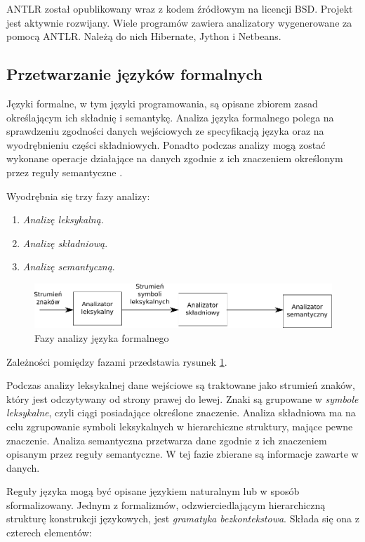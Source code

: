 ANTLR został opublikowany wraz z kodem źródłowym na licencji BSD. Projekt jest
aktywnie rozwijany. Wiele programów zawiera analizatory wygenerowane za pomocą
ANTLR. Należą do nich Hibernate, Jython i Netbeans.

\subsection{Przetwarzanie języków formalnych}
Języki formalne, w tym języki programowania, są opisane zbiorem zasad określającym
ich składnię i semantykę. Analiza języka formalnego polega na sprawdzeniu zgodności
danych wejściowych ze specyfikacją języka oraz na wyodrębnieniu części składniowych.
Ponadto podczas analizy mogą zostać wykonane operacje działające na danych zgodnie
z ich znaczeniem określonym przez reguły semantyczne \cite{compilers}.

Wyodrębnia się trzy fazy analizy:
\begin{enumerate}
\item \emph{Analizę leksykalną}.
\item \emph{Analizę składniową}.
\item \emph{Analizę semantyczną}.
\end{enumerate}

\begin{figure}[h]
  \centering
    \includegraphics[width=\textwidth]{img/antlr_phases.pdf}
    \caption{Fazy analizy języka formalnego}
    \label{antlr_phases}
\end{figure}

Zależności pomiędzy fazami przedstawia rysunek \ref{antlr_phases}. 

Podczas analizy leksykalnej dane wejściowe są traktowane jako strumień znaków, który
jest odczytywany od strony prawej do lewej. Znaki są grupowane w \emph{symbole leksykalne}, czyli
ciągi posiadające określone znaczenie. Analiza składniowa ma na celu zgrupowanie 
symboli leksykalnych w hierarchiczne struktury,
mające pewne znaczenie. Analiza semantyczna przetwarza dane zgodnie z ich znaczeniem
opisanym przez reguły semantyczne. W tej fazie zbierane są informacje zawarte w danych.

Reguły języka mogą być opisane językiem naturalnym lub w sposób sformalizowany.
Jednym z formalizmów, odzwierciedlającym hierarchiczną strukturę konstrukcji językowych,
jest \emph{gramatyka bezkontekstowa}. Składa się ona z czterech elementów:

